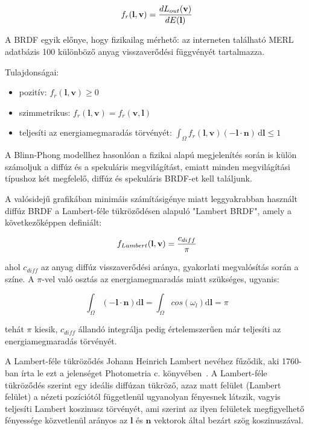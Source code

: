 \[
f_r(\mathbf{l}, \mathbf{v}) = { { dL_{out}(\mathbf{v}) } \over {dE(\mathbf{l})} }
\]

A BRDF egyik előnye, hogy fizikailag mérhető: az interneten található MERL adatbázis 100 különböző anyag visszaverődési függvényét tartalmazza.

Tulajdonságai:

\begin{itemize}[noitemsep]
\item pozitív: \(f_r(\mathbf{l},\mathbf{v}) \geq 0\)
\item szimmetrikus: \(f_r(\mathbf{l},\mathbf{v}) = f_r(\mathbf{v},\mathbf{l})\)
\item teljesíti az energiamegmaradás törvényét: \(\int_\Omega f_r(\mathbf{l},\mathbf{v}) (-\mathbf{l} \cdot \mathbf{n})\,\mathrm{d}\mathbf{l} \leq 1\)
\end{itemize}

A Blinn-Phong modellhez hasonlóan a fizikai alapú megjelenítés során is külön számoljuk a diffúz és a spekuláris megvilágítást, emiatt minden megvilágítási típushoz két megfelelő, diffúz és spekuláris BRDF-et kell találjunk.

A valósidejű grafikában minimáis számításigénye miatt leggyakrabban használt diffúz BRDF a Lambert-féle tükröződésen alapuló "Lambert BRDF", amely a következőképpen definiált:

\[
f_{Lambert}(\mathbf{l}, \mathbf{v}) = { c_{diff} \over \pi }
\]

ahol \(c_{diff}\) az anyag diffúz visszaverődési aránya, gyakorlati megvalósítás során a színe. A \(\pi\)-vel való osztás az energiamegmaradás miatt szükséges, ugyanis:

\[
\int_\Omega { (-\mathbf{l} \cdot \mathbf{n}) \mathrm{d}\mathbf{l} } = \int_\Omega { cos(\omega_l) \mathrm{d}\mathbf{l} } = \pi
\]

tehát \(\pi\) kiesik, \(c_{diff}\) állandó integrálja pedig értelemszerűen már teljesíti az energiamegmaradás törvényét.

A Lambert-féle tükröződés Johann Heinrich Lambert nevéhez fűződik, aki 1760-ban írta le ezt a jelenséget Photometria c. könyvében~\cite{klett1760ih}. A Lambert-féle tükröződés szerint egy ideális diffúzan tükröző, azaz matt felület (Lambert felület) a nézeti pozíciótól függetlenül ugyanolyan fényesnek látszik, vagyis teljesíti Lambert koszinusz törvényét, ami szerint az ilyen felületek megfigyelhető fényessége közvetlenül arányos az \(\mathbf{l}\) és \(\mathbf{n}\) vektorok által bezárt szög koszinuszával.

